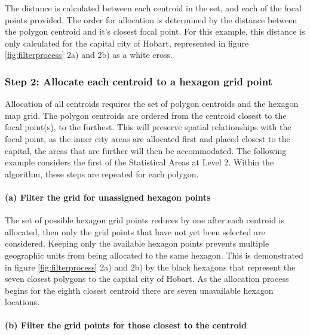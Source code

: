 The distance is calculated between each centroid in the set, and each of
the focal points provided. The order for allocation is determined by the
distance between the polygon centroid and it's closest focal point. For
this example, this distance is only calculated for the capital city of
Hobart, represented in figure \ref{fig:filterprocess} 2a) and 2b) as a
white cross.

\hypertarget{step-2-allocate-each-centroid-to-a-hexagon-grid-point}{%
\subsubsection{Step 2: Allocate each centroid to a hexagon grid
point}\label{step-2-allocate-each-centroid-to-a-hexagon-grid-point}}

Allocation of all centroids requires the set of polygon centroids and
the hexagon map grid. The polygon centroids are ordered from the
centroid closest to the focal point(s), to the furthest. This will
preserve spatial relationships with the focal point, as the inner city
areas are allocated first and placed closest to the capital, the areas
that are further will then be accommodated. The following example
considers the first of the Statistical Areas at Level 2. Within the
algorithm, these steps are repeated for each polygon.

\hypertarget{a-filter-the-grid-for-unassigned-hexagon-points}{%
\paragraph{(a) Filter the grid for unassigned hexagon
points}\label{a-filter-the-grid-for-unassigned-hexagon-points}}

The set of possible hexagon grid points reduces by one after each
centroid is allocated, then only the grid points that have not yet been
selected are considered. Keeping only the available hexagon points
prevents multiple geographic units from being allocated to the same
hexagon. This is demonstrated in figure \ref{fig:filterprocess} 2a) and
2b) by the black hexagons that represent the seven closest polygons to
the capital city of Hobart. As the allocation process begins for the
eighth closest centroid there are seven unavailable hexagon locations.

\hypertarget{b-filter-the-grid-points-for-those-closest-to-the-centroid}{%
\paragraph{(b) Filter the grid points for those closest to the
centroid}\label{b-filter-the-grid-points-for-those-closest-to-the-centroid}}


